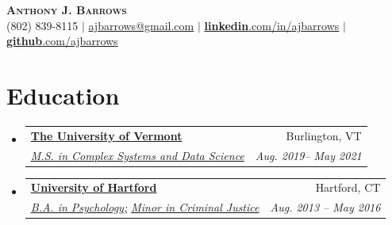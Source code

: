 \documentclass[letterpaper,11pt]{article}
\makeatletter
\newcommand{\resumeSubheading}[4]{
  \vspace{-2pt}\item
    \begin{tabular*}{0.97\textwidth}[t]{l@{\extracolsep{\fill}}r}
      \textbf{#1} & #2 \\
      \textit{\small#3} & \textit{\small #4} \\
    \end{tabular*}\vspace{-7pt}
}
\newcommand{\resumeSubHeadingListStart}{\begin{itemize}[leftmargin=0.15in, label={}]}
\newcommand{\resumeSubHeadingListEnd}{\end{itemize}}
\makeatother
\begin{document}

\begin{center}
    \textbf{\Huge \scshape Anthony J. Barrows} \\ \vspace{3pt}
    \small (802) 839-8115 $|$ \href{mailto:ajbarrows@gmail.com}{ajbarrows@gmail.com} $|$ 
    \href{https://linkedin.com/in/ajbarrows}{\textbf{linkedin}.com/in/ajbarrows} $|$ \href{https://github.com/ajbarrows}{\textbf{github}.com/ajbarrows}
\end{center}


\section{Education}
  \resumeSubHeadingListStart
    \resumeSubheading
      {\href{https://uvm.edu}{\textbf{The University of Vermont}}}{Burlington, VT}
      {\href{https://vermontcomplexsystems.org/}{M.S. in Complex Systems and Data Science}}
      {Aug. 2019-- May 2021}
    \resumeSubheading
      {\href{https://www.hartford.edu/}{\textbf{University of Hartford}}}{Hartford, CT}
      {\href{https://www.hartford.edu/academics/schools-colleges/arts-sciences/academics/departments-and-centers/psychology/default.aspx}{B.A. in Psychology;} \href{https://www.hartford.edu/academics/schools-colleges/arts-sciences/academics/departments-and-centers/sociology-and-criminal-justice/default.aspx}{Minor in Criminal Justice}}
      {Aug. 2013 -- May 2016}
  \resumeSubHeadingListEnd


\end{document}
